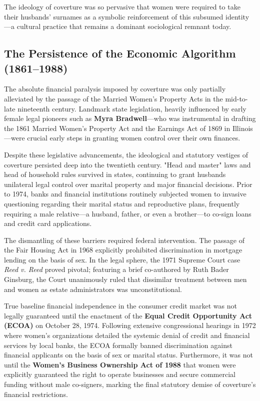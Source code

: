 \documentclass[12pt,openany]{book}
\begin{document}
The ideology of coverture was so pervasive that women were required to take their husbands' surnames as a symbolic reinforcement of this subsumed identity---a cultural practice that remains a dominant sociological remnant today.

\subsection{The Persistence of the Economic Algorithm (1861--1988)}

The absolute financial paralysis imposed by coverture was only partially alleviated by the passage of the Married Women’s Property Acts in the mid-to-late nineteenth century. Landmark state legislation, heavily influenced by early female legal pioneers such as \textbf{Myra Bradwell}---who was instrumental in drafting the 1861 Married Women’s Property Act and the Earnings Act of 1869 in Illinois---were crucial early steps in granting women control over their own finances. 

Despite these legislative advancements, the ideological and statutory vestiges of coverture persisted deep into the twentieth century. "Head and master" laws and head of household rules survived in states, continuing to grant husbands unilateral legal control over marital property and major financial decisions. Prior to 1974, banks and financial institutions routinely subjected women to invasive questioning regarding their marital status and reproductive plans, frequently requiring a male relative---a husband, father, or even a brother---to co-sign loans and credit card applications.

The dismantling of these barriers required federal intervention. The passage of the Fair Housing Act in 1968 explicitly prohibited discrimination in mortgage lending on the basis of sex. In the legal sphere, the 1971 Supreme Court case \textit{Reed v. Reed} proved pivotal; featuring a brief co-authored by Ruth Bader Ginsburg, the Court unanimously ruled that dissimilar treatment between men and women as estate administrators was unconstitutional.

True baseline financial independence in the consumer credit market was not legally guaranteed until the enactment of the \textbf{Equal Credit Opportunity Act (ECOA)} on October 28, 1974. Following extensive congressional hearings in 1972 where women's organizations detailed the systemic denial of credit and financial services by local banks, the ECOA formally banned discrimination against financial applicants on the basis of sex or marital status. Furthermore, it was not until the \textbf{Women’s Business Ownership Act of 1988} that women were explicitly guaranteed the right to operate businesses and secure commercial funding without male co-signers, marking the final statutory demise of coverture's financial restrictions.
\end{document}
